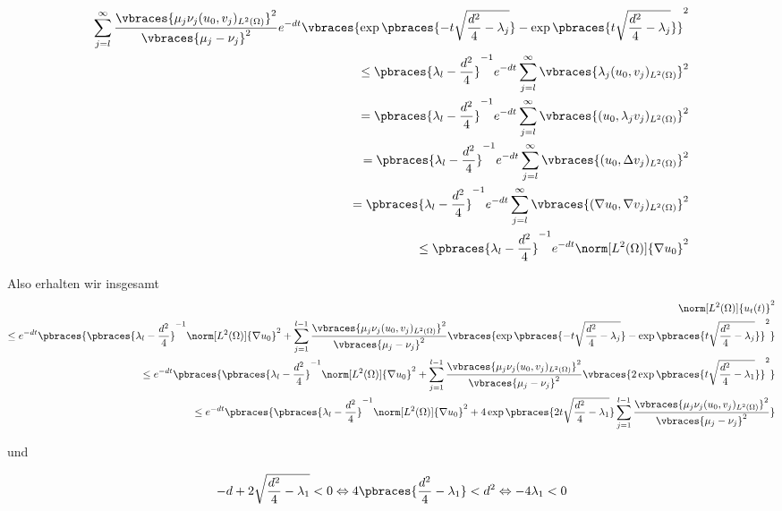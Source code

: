 \begin{solution}
\begin{enumerate}[label = (\roman*)]
\begin{align*}
		\sum_{j=l}^\infty \frac{\vbraces{\mu_j\nu_j(u_0, v_j)_{L^2(\Omega)}}^2}{\vbraces{\mu_j - \nu_j}^2} e^{-d t}\vbraces{\exp\pbraces{-t\sqrt{\frac{d^2}{4} - \lambda_j} } - \exp\pbraces{t\sqrt{\frac{d^2}{4} - \lambda_j} }}^2 \\
		\leq \pbraces{\lambda_l - \frac{d^2}{4}}^{-1} e^{-d t} \sum_{j=l}^\infty \vbraces{\lambda_j (u_0, v_j)_{L^2(\Omega)}}^2 \\
		= \pbraces{\lambda_l - \frac{d^2}{4}}^{-1} e^{-d t} \sum_{j=l}^\infty \vbraces{ (u_0, \lambda_j v_j)_{L^2(\Omega)}}^2 \\
		= \pbraces{\lambda_l - \frac{d^2}{4}}^{-1} e^{-d t} \sum_{j=l}^\infty \vbraces{ (u_0, \Delta v_j)_{L^2(\Omega)}}^2 \\
		= \pbraces{\lambda_l - \frac{d^2}{4}}^{-1} e^{-d t} \sum_{j=l}^\infty \vbraces{ (\nabla u_0, \nabla v_j)_{L^2(\Omega)}}^2 \\
		\leq \pbraces{\lambda_l - \frac{d^2}{4}}^{-1} e^{-d t} \norm[L^2(\Omega)]{\nabla u_0}^2
	\end{align*}

	Also erhalten wir insgesamt
	\begin{align*}
		\norm[L^2(\Omega)]{u_t(t)}^2 \\
		 \leq e^{- d t} \pbraces{ \pbraces{\lambda_l - \frac{d^2}{4}}^{-1} \norm[L^2(\Omega)]{\nabla u_0}^2 + \sum_{j=1}^{l-1} \frac{\vbraces{\mu_j\nu_j(u_0, v_j)_{L^2(\Omega)}}^2}{\vbraces{\mu_j - \nu_j}^2} \vbraces{\exp\pbraces{-t\sqrt{\frac{d^2}{4} - \lambda_j} } - \exp\pbraces{t\sqrt{\frac{d^2}{4} - \lambda_j} }}^2} \\
		 \leq  e^{- d t} \pbraces{ \pbraces{\lambda_l - \frac{d^2}{4}}^{-1} \norm[L^2(\Omega)]{\nabla u_0}^2 + \sum_{j=1}^{l-1} \frac{\vbraces{\mu_j\nu_j(u_0, v_j)_{L^2(\Omega)}}^2}{\vbraces{\mu_j - \nu_j}^2} \vbraces{2 \exp\pbraces{t\sqrt{\frac{d^2}{4} - \lambda_1} }}^2} \\
		 \leq e^{- d t} \pbraces{ \pbraces{\lambda_l - \frac{d^2}{4}}^{-1} \norm[L^2(\Omega)]{\nabla u_0}^2 + 4 \exp\pbraces{2t\sqrt{\frac{d^2}{4} - \lambda_1} } \sum_{j=1}^{l-1} \frac{\vbraces{\mu_j\nu_j(u_0, v_j)_{L^2(\Omega)}}^2}{\vbraces{\mu_j - \nu_j}^2} }
	\end{align*}
	
	und
	
	\begin{align*}
		-d + 2 \sqrt{\frac{d^2}{4} - \lambda_1} < 0 \Leftrightarrow 4 \pbraces{\frac{d^2}{4} - \lambda_1} < d^2 \Leftrightarrow -4 \lambda_1 < 0
	\end{align*}
	

\end{enumerate}
\end{solution}
